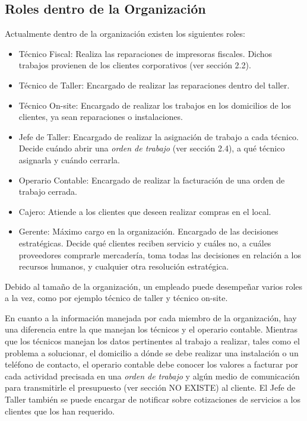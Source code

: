 \documentclass[12pt]{extarticle}
\begin{document}
\begin{spacing}{1.2}
    \subsection{Roles dentro de la Organización}
    Actualmente dentro de la organización existen los siguientes roles:
    \begin{itemize}
        \item Técnico Fiscal: Realiza las reparaciones de impresoras fiscales. Dichos trabajos provienen de los clientes corporativos (ver sección 2.2).
        \item Técnico de Taller: Encargado de realizar las reparaciones dentro del taller.
        \item Técnico On-site: Encargado de realizar los trabajos en los domicilios de los clientes, ya sean reparaciones o instalaciones.
        \item Jefe de Taller: Encargado de realizar la asignación de trabajo a cada técnico. Decide cuándo abrir una \textit{orden de trabajo} (ver sección 2.4), a qué técnico asignarla y cuándo cerrarla.
        \item Operario Contable: Encargado de realizar la facturación de una orden de trabajo cerrada.
        \item Cajero: Atiende a los clientes que deseen realizar compras en el local.
        \item Gerente: Máximo cargo en la organización. Encargado de las decisiones estratégicas. Decide qué clientes reciben servicio y cuáles no, a cuáles proveedores comprarle mercadería, toma todas las decisiones en relación a los recursos humanos, y cualquier otra resolución estratégica.  
    \end{itemize}
    

    Debido al tamaño de la organización, un empleado puede desempeñar varios roles a la vez, como por ejemplo técnico de taller y técnico on-site.  

    En cuanto a la información manejada por cada miembro de la organización, hay una diferencia entre la que manejan los técnicos y el operario contable. Mientras que los técnicos manejan los datos pertinentes al trabajo a realizar, tales como el problema a solucionar, el domicilio a dónde se debe realizar una instalación o un teléfono de contacto, el operario contable debe conocer los valores a facturar por cada actividad precisada en una \textit{orden de trabajo} y algún medio de comunicación para transmitirle el presupuesto (ver sección NO EXISTE) al cliente. El Jefe de Taller también se puede encargar de notificar sobre cotizaciones de servicios a los clientes que los han requerido.


\end{spacing}
\end{document}
